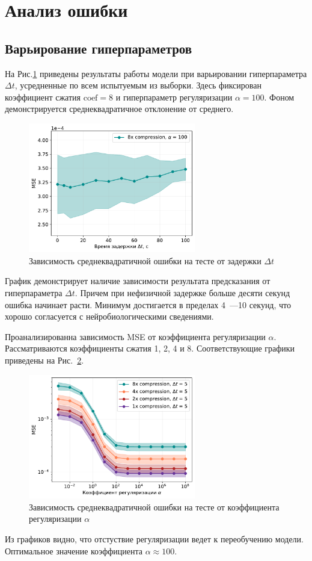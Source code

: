 \documentclass[12pt,twoside]{article}
\begin{document}
\section{Анализ ошибки}
\subsection{Варьирование гиперпараметров}
На Рис.\ref{MSE_dt_main} приведены результаты работы модели при варьировании гиперпараметра $\Delta t$, усредненные по всем испытуемым из выборки. Здесь фиксирован коэффициент сжатия $\mathrm{coef} = 8$ и гиперпараметр регуляризации $\alpha = 100$. Фоном демонстрируется среднеквадратичное отклонение от среднего.
\begin{figure}[h!]
    \centering
    \includegraphics[width=0.65\textwidth]{subs_delta_MSE_dt.pdf}
    \caption{Зависимость среднеквадратичной ошибки на тесте от задержки ${\Delta t}$}
    \label{MSE_dt_main}
\end{figure}
График демонстрирует наличие зависимости результата предсказания от гиперпараметра $\Delta t$. 
Причем при нефизичной задержке больше десяти секунд ошибка начинает расти. 
Минимум достигается в пределах 4~---10 секунд, что хорошо согласуется с нейробиологическими сведениями.

Проанализированна зависимость MSE от коэффициента регуляризации $\alpha$.
Рассматриваются коэффициенты сжатия 1, 2, 4 и 8. 
Соответствующие графики приведены на Рис.~\ref{subs_MSE_alpha}.
\begin{figure}[h!]
    \centering
    \includegraphics[width=0.65\textwidth]{subs_MSE_alpha.pdf}
    \caption{Зависимость среднеквадратичной ошибки на тесте от коэффициента регуляризации $\alpha$}
    \label{subs_MSE_alpha}
\end{figure}
Из графиков видно, что отстуствие регуляризации ведет к переобучению модели.
Оптимальное значение коэффициента $\alpha \approx 100$.
\end{document}
